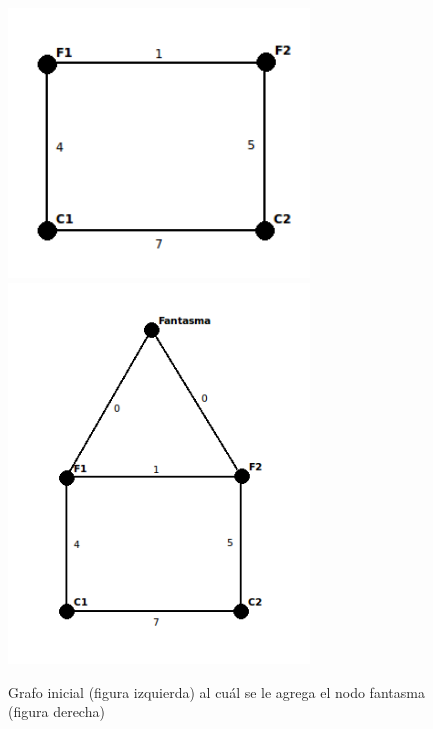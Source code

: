 \documentclass[a4paper, 10pt, twoside]{article}
\begin{document}
\begin{figure}[H]
\includegraphics[width=80mm]{../ejemplo_graficos/CosoDosSubconjuntos.png}
\includegraphics[width=80mm]{../ejemplo_graficos/CosoDosSubconjuntosConNodoFantasma.png}
\caption{Grafo inicial (figura izquierda) al cuál se le agrega el nodo fantasma (figura derecha)}
\end{figure} 
\end{document}
